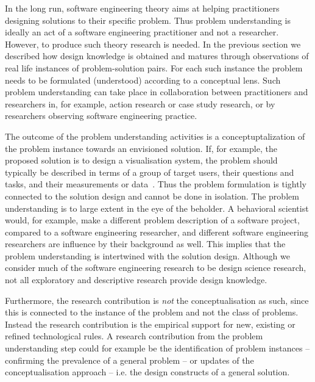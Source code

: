 \documentclass[graybox]{svmult}
\begin{document}
In the long run, software engineering theory aims at helping practitioners designing solutions to their specific problem. Thus problem understanding is ideally an act of a software engineering practitioner and not a researcher. However, to produce such theory research is needed. In the previous section we described how design knowledge is obtained and matures through observations of real life instances of problem-solution pairs. For each such instance the problem needs to be formulated (understood) according to a conceptual lens. Such problem understanding can take place in collaboration between practitioners and researchers in, for example, action research or case study research, or by researchers observing software engineering practice.


The outcome of the problem understanding activities is a conceptuptalization of the problem instance towards an envisioned solution. If, for example, the proposed solution is to design a visualisation system, the problem should typically be described in terms of a group of target users, their questions and tasks, and their measurements or data~\cite{meyer_nested_2015}. Thus the problem formulation is tightly connected to the solution design and cannot be done in isolation. The problem understanding is to large extent in the eye of the beholder. A behavioral scientist would, for example,  make a different problem description of a software project, compared to a software engineering researcher, and different software engineering researchers are influence by their background as well. This implies that the problem understanding is intertwined with the solution design.
Although we consider much of the software engineering research to be design science research, not all exploratory and descriptive research provide design knowledge.


Furthermore, the research contribution is \emph{not} the conceptualisation as such, since this is connected to the instance of the problem and not the class of problems. Instead the research contribution is the empirical support for new, existing or refined technological rules. A research contribution from the problem understanding step could for example be the identification of problem instances -- confirming the prevalence of a general problem -- or updates of the conceptualisation approach -- i.e. the design constructs of a general solution.
\end{document}
